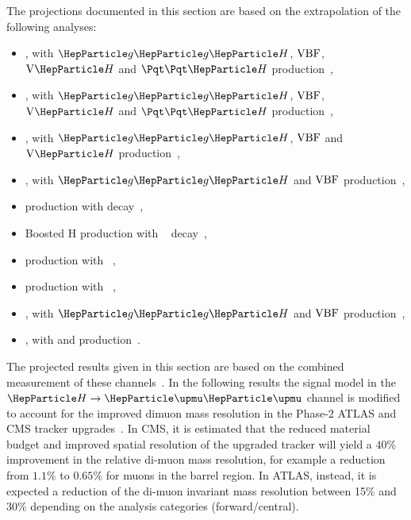
The projections documented in this section are based on the extrapolation of the following analyses:

\begin{itemize}
	\item \hgg, with $\ggh$, $\mathrm{VBF}$, $\vh$ and $\tth$ production~\cite{Sirunyan:2018ouh,ATLAS-CONF-2018-028,Aaboud:2018urx},
	\item \hzzllll, with $\ggh$, $\mathrm{VBF}$, $\vh$ and $\tth$ production~\cite{HIG16041,ATLAS-CONF-2018-018},
	\item \hwwlnln, with $\ggh$, $\mathrm{VBF}$ and $\vh$ production~\cite{HIG-16-042,Aaboud:2018jqu},
	\item \htt, with $\ggh$ and $\mathrm{VBF}$ production~\cite{HIG16043,ATLAS-CONF-2018-021},
	\item \vh production with \hbb decay~\cite{HIG16044,Aaboud:2018zhk},
	\item Boosted H production with \hbb~ decay~\cite{HIG17010},
	\item \tth production with \hlep~\cite{Sirunyan:2018shy,Aaboud:2017jvq},
	\item \tth production with \hbb~\cite{bib:hig-17-026,Sirunyan:2018ygk,Aaboud:2017rss},
	\item \hmm, with $\ggh$ and $\mathrm{VBF}$ production~\cite{HIG-17-019,ATLAS-CONF-2018-026},
	\item \hzg, with \ggh and \vbf production~\cite{Aaboud:2017uhw}.
\end{itemize}

The projected results given in this section are based on the combined measurement of these channels~\cite{Sirunyan:2018koj,ATLAS-CONF-2018-031}. In the following results the signal model in the $\hmm$ channel is modified to account for the improved dimuon mass resolution in the Phase-2 ATLAS and CMS tracker upgrades~\cite{Klein:2017nke,Collaboration:2285585}. In CMS, it is estimated that the reduced material budget and improved spatial resolution of the upgraded tracker will yield a $40\%$ improvement in the relative di-muon mass resolution, for example a reduction from $1.1\%$ to $0.65\%$ for muons in the barrel region. In ATLAS, instead, it is expected a reduction of the di-muon invariant mass resolution between 15\% and 30\% depending on the analysis categories (forward/central).


